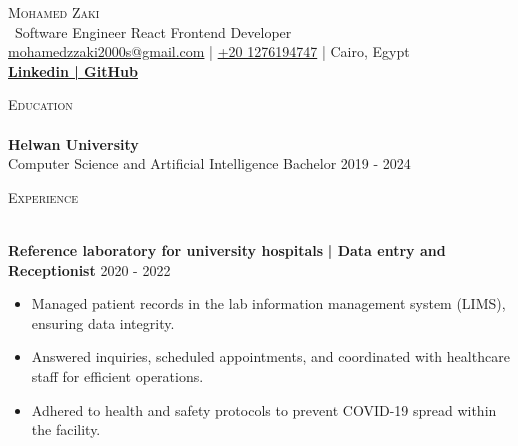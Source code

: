 \documentclass[a4paper]{article}
\newcommand{\lineunder} {
    \vspace*{-8pt} \\
    \hspace*{-18pt} \hrulefill \\
}
\newcommand{\header} [1] {
    {\hspace*{-18pt}\vspace*{6pt} \textsc{#1}}
    \vspace*{-6pt} \lineunder
}
\begin{document}
    \vspace*{-40pt}

    

%
%
  \vspace*{-2pt}
  \begin{center}
    {\Huge \scshape {Mohamed Zaki}}\\
    \vspace*{2pt}
    \ {Software Engineer \textbar{} React Frontend Developer}\\
    \vspace*{2pt}
    \href{mailto:mohamedzzaki2000s@gmail.com}{mohamedzzaki2000s@gmail.com} | \href{tel:+20 1276194747}{+20 1276194747} | Cairo, Egypt\\
    \vspace*{2pt}
    \textbf{\href{https://www.linkedin.com/in/mohamed-zaki-55983b287/}{Linkedin | }}\textbf{\href{https://github.com/MohamedZakidev}{GitHub}}\\
  \end{center}



      \header{Education}
      \vspace{2mm}
      \textbf{Helwan University}\\
Computer Science and Artificial Intelligence Bachelor \hfill 2019 - 2024\\

\vspace{2mm}

      \header{Experience}
      \vspace{2mm}

      \textbf{Reference laboratory for university hospitals}\textbf{ | Data entry and Receptionist} \hfill  2020 - 2022\\
          \vspace{-3mm}
\begin{itemize} \itemsep -3pt
\item  Managed patient records in the lab information management system (LIMS), ensuring data integrity.
\item  Answered inquiries, scheduled appointments, and coordinated with healthcare staff for efficient operations.
\item  Adhered to health and safety protocols to prevent COVID-19 spread within the facility.
\end{itemize}
\end{document}
